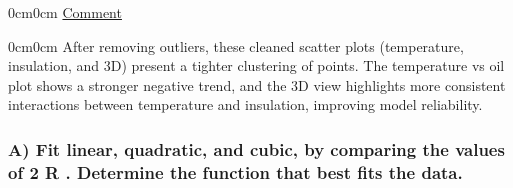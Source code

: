 \documentclass[12pt]{article}
\begin{document}
\begin{adjustwidth} {0cm}{0cm}
    \uline{Comment}
\end{adjustwidth}
\begin{adjustwidth} {0cm}{0cm}
After removing outliers, these cleaned scatter plots (temperature, insulation, and 3D)
present a tighter clustering of points. The temperature vs oil plot shows a stronger
negative trend, and the 3D view highlights more consistent interactions between
temperature and insulation, improving model reliability.
\end{adjustwidth}

\subsubsection*{A) Fit linear, quadratic, and cubic, by comparing the values of 2 R . Determine the
function that best fits the data.}
\end{document}
